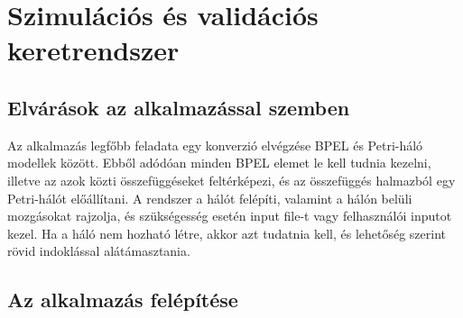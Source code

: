 \chapter{Szimulációs és validációs keretrendszer}
\section{Elvárások az alkalmazással szemben}

Az alkalmazás legfőbb feladata egy konverzió elvégzése BPEL és Petri-háló modellek között. Ebből adódóan minden BPEL elemet le kell tudnia kezelni, illetve az azok közti összefüggéseket feltérképezi, és az összefüggés halmazból egy Petri-hálót előállítani. A rendszer a hálót felépíti, valamint a hálón belüli mozgásokat rajzolja, és szükségesség esetén input file-t vagy felhasználói inputot kezel. Ha a háló nem hozható létre, akkor azt tudatnia kell, és lehetőség szerint rövid indoklással alátámasztania. 

\section{Az alkalmazás felépítése}

